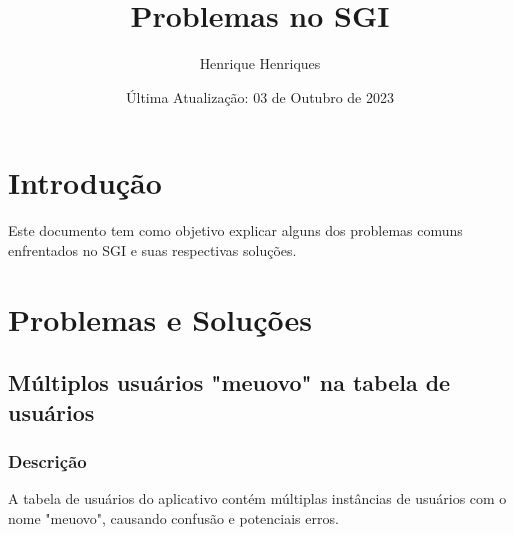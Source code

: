 \documentclass[12pt]{article}
\title{Problemas no SGI}
\author{Henrique Henriques}
\date{Última Atualização: 03 de Outubro de 2023}
\begin{document}
\maketitle

\section{Introdução}
Este documento tem como objetivo explicar alguns dos problemas comuns enfrentados no SGI e suas respectivas soluções.

\section{Problemas e Soluções}
\subsection{Múltiplos usuários "meuovo" na tabela de usuários}
\subsubsection{Descrição}
A tabela de usuários do aplicativo contém múltiplas instâncias de usuários com o nome "meuovo", causando confusão e potenciais erros.
\end{document}
